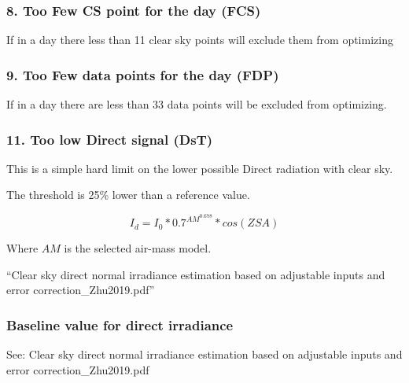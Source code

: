 \documentclass[
  10pt,
  a4paper,oneside]{article}
\begin{document}
\hypertarget{too-few-cs-point-for-the-day-fcs}{%
\subsubsection{8. Too Few CS point for the day (FCS)}\label{too-few-cs-point-for-the-day-fcs}}

If in a day there less than 11 clear sky points will exclude them from optimizing

\hypertarget{too-few-data-points-for-the-day-fdp}{%
\subsubsection{9. Too Few data points for the day (FDP)}\label{too-few-data-points-for-the-day-fdp}}

If in a day there are less than 33 data points will be excluded from optimizing.

\hypertarget{too-low-direct-signal-dst}{%
\subsubsection{11. Too low Direct signal (DsT)}\label{too-low-direct-signal-dst}}

This is a simple hard limit on the lower possible Direct radiation with clear sky.

The threshold is 25\% lower than a reference value.

\[ I_d = I_0 * 0.7^{{AM}^{0.678}} * cos({ZSA}) \]

Where \({AM}\) is the selected air-mass model.

``Clear sky direct normal irradiance estimation based on adjustable inputs and error correction\_Zhu2019.pdf''

\hypertarget{baseline-value-for-direct-irradiance}{%
\subsubsection{Baseline value for direct irradiance}\label{baseline-value-for-direct-irradiance}}

See: Clear sky direct normal irradiance estimation based on adjustable inputs and error correction\_Zhu2019.pdf
\end{document}
